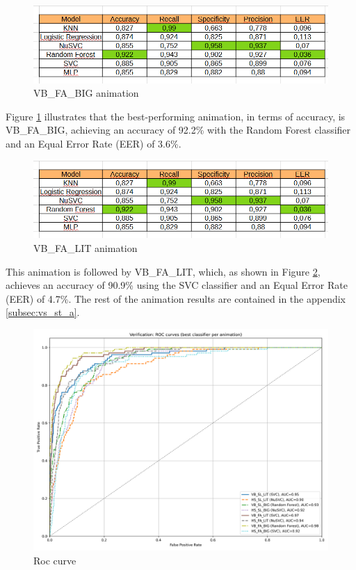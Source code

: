 \documentclass{article}
\begin{document}
\begin{figure}[ht]
    \centering
    \includegraphics[width = 0.8
    \textwidth]{Images/Results/Verification_single/st/VB_FA_BIG.png}
    \caption{VB\_FA\_BIG animation}
    \label{fig:VB_FA_BIG_st}
\end{figure}

Figure \ref{fig:VB_FA_BIG_st} illustrates that the best-performing animation, in terms of accuracy, is VB\_FA\_BIG, achieving an accuracy of 92.2\% with the Random Forest classifier and an Equal Error Rate (EER) of 3.6\%.

\begin{figure}[ht]
    \centering
    \includegraphics[width = 0.8
    \textwidth]{Images/Results/Verification_single/st/VB_FA_BIG.png}
    \caption{VB\_FA\_LIT animation}
    \label{fig:VB_FA_LIT_st}
\end{figure}

This animation is followed by VB\_FA\_LIT, which, as shown in Figure \ref{fig:VB_FA_LIT_st}, achieves an accuracy of 90.9\% using the SVC classifier and an Equal Error Rate (EER) of 4.7\%.
The rest of the animation results are contained in the appendix \ref{subsec:vs_st_a}.

\begin{figure}[ht]
    \centering
    \includegraphics[width = 0.6
    \textwidth]{Images/Results/Verification_single/st/best_animation_roc_curves_st.png}
    \caption{Roc curve}
    \label{fig:roc_st}
\end{figure}
\end{document}

